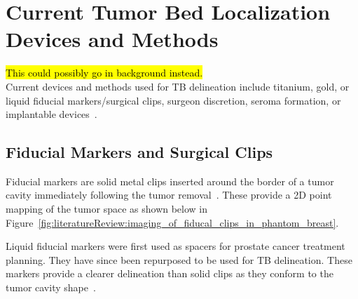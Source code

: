 \section{Current Tumor Bed Localization Devices and Methods\label{sec:literatureReview:currentMethods}}

\hl{This could possibly go in background instead.\\}
Current devices and methods used for TB delineation include titanium, gold, or liquid fiducial markers/surgical clips, surgeon discretion, seroma formation, or implantable devices~\cite{RefWorks:RefID:25-acree2022review}.

\subsection{Fiducial Markers and Surgical Clips\label{sec:literatureReview:currentMethods:fiducialMarkers}}
Fiducial markers are solid metal clips inserted around the border of a tumor cavity immediately following the tumor removal~\cite{RefWorks:RefID:358-nihdefining}. These provide a 2D point mapping of the tumor space as shown below in Figure~\ref{fig:literatureReview:imaging_of_fiducal_clips_in_phantom_breast}.

Liquid fiducial markers were first used as spacers for prostate cancer treatment planning. They have since been repurposed to be used for TB delineation. These markers provide a clearer delineation than solid clips as they conform to the tumor cavity shape~\cite{RefWorks:RefID:25-acree2022review}.


